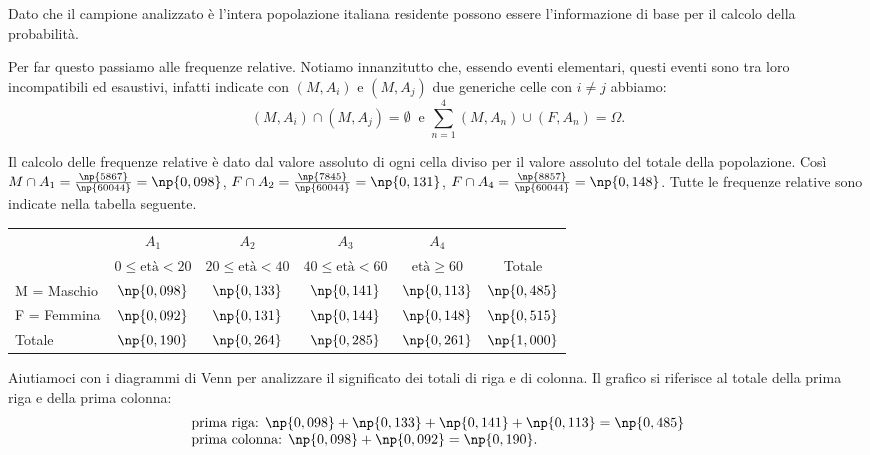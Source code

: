Dato che il campione analizzato è l'intera popolazione
italiana residente possono essere l'informazione di base per il calcolo della
probabilità.

Per far questo passiamo alle frequenze relative. 
Notiamo innanzitutto che, essendo eventi elementari, questi eventi sono tra loro incompatibili ed esaustivi, infatti indicate con $ (M,A_{i}) $ e $ (M,A_{j}) $ due generiche celle con $ i\neq j $ abbiamo:
\[(M,A_{i})\cap(M,A_{j})=\emptyset~\text{ e }\sum_{n=1}^4 (M,A_{n})\cup(F,A_{n})=\Omega.\]

Il calcolo delle frequenze relative è dato dal valore assoluto di ogni cella diviso per il valore assoluto del totale della popolazione. Così $M\cap A_1=\frac{\np{5867}}{\np{60044}}=\np{0,098}$, $F\cap A_2=\frac{\np{7845}}{\np{60044}}=\np{0,131}$, $F\cap A_4=\frac{\np{8857}}{\np{60044}}=\np{0,148}$.
Tutte le frequenze relative sono indicate nella tabella seguente.

\begin{center}
\begin{tabular}{lccccc}
& $ A_1 $
& $ A_2 $
& $ A_3 $
& $ A_4 $
& \\

& $ 0\le \text{età}<20 $
& $ 20\le \text{età}<40 $
& $ 40\le \text{età}<60 $
& $ \text{età}\ge 60 $
& Totale\\

M = Maschio & $ \np{0,098} $ & $ \np{0,133} $ & $ \np{0,141} $ & $ \np{0,113} $ & $ \np{0,485} $ \\
F = Femmina & $ \np{0,092} $ & $ \np{0,131} $ & $ \np{0,144} $ & $ \np{0,148} $ & $ \np{0,515} $ \\

Totale & $ \np{0,190} $ & $ \np{0,264} $ & $ \np{0,285} $ & $ \np{0,261} $ & $ \np{1,000} $ %
\end{tabular}
\end{center}

Aiutiamoci con i diagrammi di Venn per analizzare il significato dei
totali di riga e di colonna. Il grafico si riferisce al
totale della prima riga e della prima colonna: 
\[\begin{array}{l}{\text{prima riga: }\np{0,098}+\np{0,133}+\np{0,141}+\np{0,113}=\np{0,485}}\\{\text{prima colonna: }\np{0,098}+\np{0,092}=\np{0,190}.}\end{array}\]
\begin{center}
 
\end{center}

